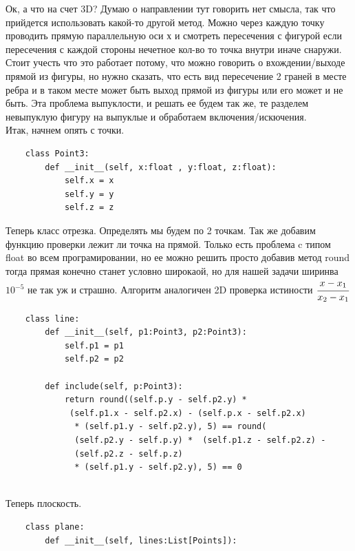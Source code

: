 \documentclass[12pt]{article} %
\begin{document}
 	\hspace*{1cm}Ок, а что на счет 3D? Думаю о направлении тут говорить нет смысла, так что прийдется использовать какой-то другой метод. Можно через каждую точку проводить прямую параллельную оси х и смотреть пересечения с фигурой если пересечения с каждой стороны нечетное кол-во то точка внутри иначе снаружи. Стоит учесть что это работает потому, что можно говорить о вхождении/выходе прямой из фигуры, но нужно сказать, что есть вид пересечение 2 граней в месте ребра и в таком месте может быть выход прямой из фигуры или его может и не быть. Эта проблема выпуклости, и решать ее будем так же, те разделем невыпуклую фигуру на выпуклые и обработаем включения/искючения.\\
 	\hspace*{1cm}Итак, начнем опять с точки.
 	\begin{verbatim}
 	class Point3:
 	    def __init__(self, x:float , y:float, z:float):
 	        self.x = x
 	        self.y = y
 	        self.z = z
 	\end{verbatim}
 	\hspace*{1cm}Теперь класс отрезка. Определять мы будем по 2 точкам. Так же добавим функцию проверки лежит ли точка на прямой. Только есть проблема c типом float во всем програмировании, но ее можно решить просто добавив метод round тогда прямая конечно станет условно широкаой, но для нашей задачи ширинва $10^{-5}$ не так уж и страшно. Алгоритм аналогичен 2D проверка истиности $\cfrac{x - x_1}{x_2 - x_1}$
 	\begin{verbatim}
 	class line:
 	    def __init__(self, p1:Point3, p2:Point3):
 	        self.p1 = p1
 	        self.p2 = p2
 	    
 	    def include(self, p:Point3):
 	        return round((self.p.y - self.p2.y) *
 	         (self.p1.x - self.p2.x) - (self.p.x - self.p2.x)
 	          * (self.p1.y - self.p2.y), 5) == round(
 	          (self.p2.y - self.p.y) *  (self.p1.z - self.p2.z) - 
 	          (self.p2.z - self.p.z)
 	          * (self.p1.y - self.p2.y), 5) == 0
 	       
    \end{verbatim}
    \hspace*{1cm}Теперь плоскость.
    \begin{verbatim}
    class plane:
        def __init__(self, lines:List[Points]):
            
    \end{verbatim}
 
\end{document}
